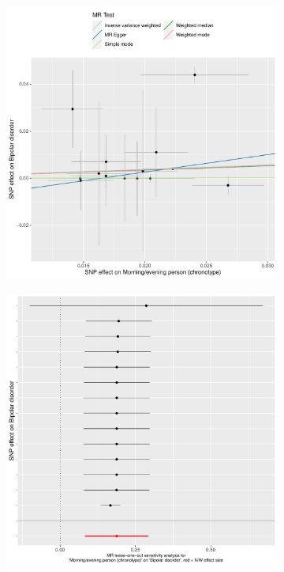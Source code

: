 \documentclass[genes,article,accept,moreauthors,pdftex]{Definitions/mdpi}
\begin{document}
\begin{figure}[H]
{\captionsetup{position=bottom,justification=centering}
\begin{subfigure}{.5\linewidth}
	\includegraphics[width=\linewidth]{Figs/Analysis2/Morning_evening_person_(chronotype)_vs_Bipolar_disorder.Scatterplots.pdf}
\caption{}
\label{bipolarScatter}
\end{subfigure}
\begin{subfigure}{.5\linewidth}
	\includegraphics[width=0.95\linewidth,keepaspectratio]{Figs/Analysis2/Morning_evening_person_(chronotype)_vs_Bipolar_disorder.LOOplots.pdf}

\end{subfigure}}
\end{figure}
\end{document}
